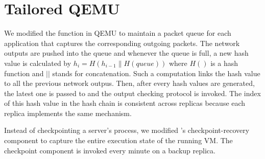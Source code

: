 \section{Tailored QEMU} \label{sec:qemu}

We modified the \taprecv function in QEMU to maintain a packet queue for each application 
that captures the corresponding outgoing packets. The network outputs are pushed into the 
queue and whenever the queue is full, a new hash value is calculated by 
$h_i=H(h_{i-1}\|H(queue))$ where $H()$ is a hash function and $||$ stands for concatenation. 
Such a computation links the hash value to all the previous network outpus. Then, after every 
\thashcomp hash values are generated, the latest one is passed to \smrsystem and the output 
checking protocol is invoked. The index of this hash value in the hash chain is 
consistent across replicas because each replica implements the same mechanism. 

Instead of checkpointing a server's process, we modified \smrsystem's checkpoint-recovery 
component to capture the entire execution state of the running VM. The checkpoint component is 
invoked every minute on a backup replica. 
